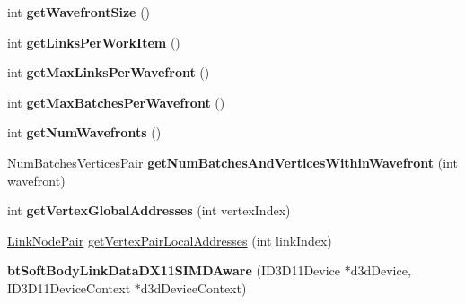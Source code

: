 \begin{DoxyCompactItemize}
\item 
\mbox{\label{classbtSoftBodyLinkDataDX11SIMDAware_a65ef737048647732582654d261507431}} 
int {\bfseries get\+Wavefront\+Size} ()
\item 
\mbox{\label{classbtSoftBodyLinkDataDX11SIMDAware_ac47628aa9649a869e5083a1001ac1cd1}} 
int {\bfseries get\+Links\+Per\+Work\+Item} ()
\item 
\mbox{\label{classbtSoftBodyLinkDataDX11SIMDAware_aba00f381da3b24c99d418acf9a76374c}} 
int {\bfseries get\+Max\+Links\+Per\+Wavefront} ()
\item 
\mbox{\label{classbtSoftBodyLinkDataDX11SIMDAware_ae4e98917c9f9602c42a6a1b550284a9f}} 
int {\bfseries get\+Max\+Batches\+Per\+Wavefront} ()
\item 
\mbox{\label{classbtSoftBodyLinkDataDX11SIMDAware_a235246a60a82333a369be2ddc5eb950e}} 
int {\bfseries get\+Num\+Wavefronts} ()
\item 
\mbox{\label{classbtSoftBodyLinkDataDX11SIMDAware_a0f485c42cb17b28a2aff1d4abb0f45c2}} 
\hyperlink{structbtSoftBodyLinkDataDX11SIMDAware_1_1NumBatchesVerticesPair}{Num\+Batches\+Vertices\+Pair} {\bfseries get\+Num\+Batches\+And\+Vertices\+Within\+Wavefront} (int wavefront)
\item 
\mbox{\label{classbtSoftBodyLinkDataDX11SIMDAware_adf129c8a7ed3090c71dd94c31c12a410}} 
int {\bfseries get\+Vertex\+Global\+Addresses} (int vertex\+Index)
\item 
\hyperlink{classbtSoftBodyLinkData_1_1LinkNodePair}{Link\+Node\+Pair} \hyperlink{classbtSoftBodyLinkDataDX11SIMDAware_ac3eb087312fd7433a9f32f8eee8e40a3}{get\+Vertex\+Pair\+Local\+Addresses} (int link\+Index)
\item 
\mbox{\label{classbtSoftBodyLinkDataDX11SIMDAware_a267670e3a238d94e2b8bc99b5a780beb}} 
{\bfseries bt\+Soft\+Body\+Link\+Data\+D\+X11\+S\+I\+M\+D\+Aware} (I\+D3\+D11\+Device $\ast$d3d\+Device, I\+D3\+D11\+Device\+Context $\ast$d3d\+Device\+Context)

\end{DoxyCompactItemize}
